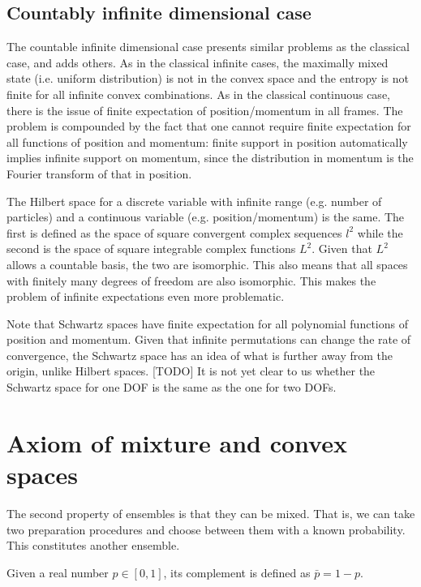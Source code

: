 \subsection{Countably infinite dimensional case}

The countable infinite dimensional case presents similar problems as the classical case, and adds others. As in the classical infinite cases, the maximally mixed state (i.e. uniform distribution) is not in the convex space and the entropy is not finite for all infinite convex combinations. As in the classical continuous case, there is the issue of finite expectation of position/momentum in all frames. The problem is compounded by the fact that one cannot require finite expectation for all functions of position and momentum: finite support in position automatically implies infinite support on momentum, since the distribution in momentum is the Fourier transform of that in position.

The Hilbert space for a discrete variable with infinite range (e.g. number of particles) and a continuous variable (e.g. position/momentum) is the same. The first is defined as the space of square convergent complex sequences $l^2$ while the second is the space of square integrable complex functions $L^2$. Given that $L^2$ allows a countable basis, the two are isomorphic. This also means that all spaces with finitely many degrees of freedom are also isomorphic. This makes the problem of infinite expectations even more problematic.

Note that Schwartz spaces have finite expectation for all polynomial functions of position and momentum. Given that infinite permutations can change the rate of convergence, the Schwartz space has an idea of what is further away from the origin, unlike Hilbert spaces. [TODO] It is not yet clear to us whether the Schwartz space for one DOF is the same as the one for two DOFs.

\section{Axiom of mixture and convex spaces}

The second property of ensembles is that they can be mixed. That is, we can take two preparation procedures and choose between them with a known probability. This constitutes another ensemble.


\begin{defn}
	Given a real number $p \in [0,1]$, its complement is defined as $\bar{p} = 1-p$.
\end{defn}

